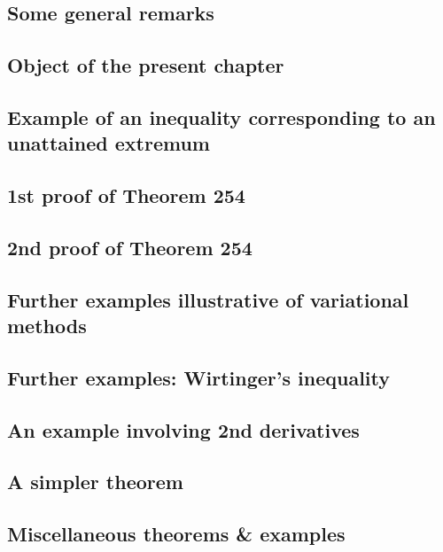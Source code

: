 \documentclass[oneside]{book}
\numberwithin{equation}{section}
\begin{document}
\subsection{Some general remarks}

\subsection{Object of the present chapter}

\subsection{Example of an inequality corresponding to an unattained extremum}

\subsection{1st proof of Theorem 254}

\subsection{2nd proof of Theorem 254}

\subsection{Further examples illustrative of variational methods}

\subsection{Further examples: Wirtinger's inequality}

\subsection{An example involving 2nd derivatives}

\subsection{A simpler theorem}

\subsection{Miscellaneous theorems \& examples}

\end{document}
